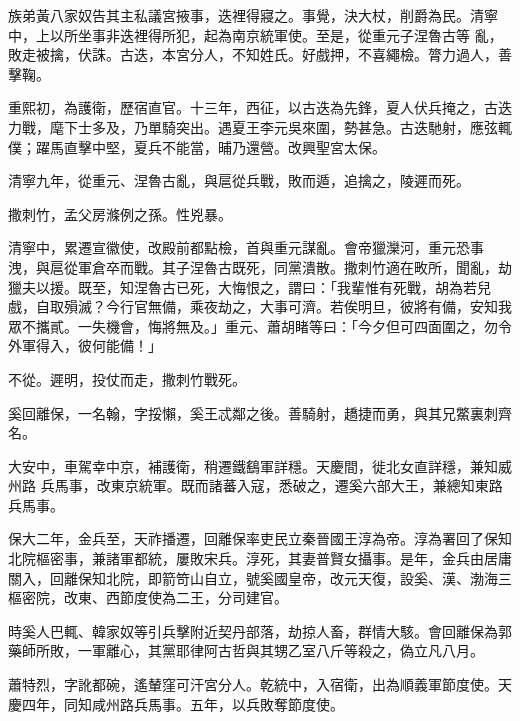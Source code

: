\begin{pinyinscope}
 族弟黃八家奴告其主私議宮掖事，迭裡得寢之。事覺，決大杖，削爵為民。清寧中，上以所坐事非迭裡得所犯，起為南京統軍使。至是，從重元子涅魯古等
 亂，敗走被擒，伏誅。古迭，本宮分人，不知姓氏。好戲押，不喜繩檢。膂力過人，善擊鞠。



 重熙初，為護衛，歷宿直官。十三年，西征，以古迭為先鋒，夏人伏兵掩之，古迭力戰，麾下士多及，乃單騎突出。遇夏王李元吳來圍，勢甚急。古迭馳射，應弦輒僕；躍馬直擊中堅，夏兵不能當，晡乃還營。改興聖宮太保。



 清寧九年，從重元、涅魯古亂，與扈從兵戰，敗而遁，追擒之，陵遲而死。



 撒刺竹，孟父房滌例之孫。性兇暴。



 清寧中，累遷宣徽使，改殿前都點檢，首與重元謀亂。會帝獵灤河，重元恐事
 洩，與扈從軍倉卒而戰。其子涅魯古既死，同黨潰散。撒刺竹適在畋所，聞亂，劫獵夫以援。既至，知涅魯古已死，大悔恨之，謂曰：「我輩惟有死戰，胡為若兒戲，自取殞滅？今行官無備，乘夜劫之，大事可濟。若俟明旦，彼將有備，安知我眾不攜貳。一失機會，悔將無及。」重元、蕭胡睹等曰：「今夕但可四面圍之，勿令外軍得入，彼何能備！」



 不從。遲明，投仗而走，撒刺竹戰死。



 奚回離保，一名翰，字挼懶，奚王忒鄰之後。善騎射，趫捷而勇，與其兄鱉裏刺齊名。



 大安中，車駕幸中京，補護衛，稍遷鐵鷂軍詳穩。天慶間，徙北女直詳穩，兼知威州路
 兵馬事，改東京統軍。既而諸蕃入寇，悉破之，遷奚六部大王，兼總知東路兵馬事。



 保大二年，金兵至，天祚播遷，回離保率吏民立秦晉國王淳為帝。淳為署回了保知北院樞密事，兼諸軍都統，屢敗宋兵。淳死，其妻普賢女攝事。是年，金兵由居庸關入，回離保知北院，即箭笴山自立，號奚國皇帝，改元天復，設奚、漢、渤海三樞密院，改東、西節度使為二王，分司建官。



 時奚人巴輒、韓家奴等引兵擊附近契丹部落，劫掠人畜，群情大駭。會回離保為郭藥師所敗，一軍離心，其黨耶律阿古哲與其甥乙室八斤等殺之，偽立凡八月。



 蕭特烈，字訛都碗，遙輦窪可汗宮分人。乾統中，入宿衛，出為順義軍節度使。天慶四年，同知咸州路兵馬事。五年，以兵敗奪節度使。




\end{pinyinscope}
